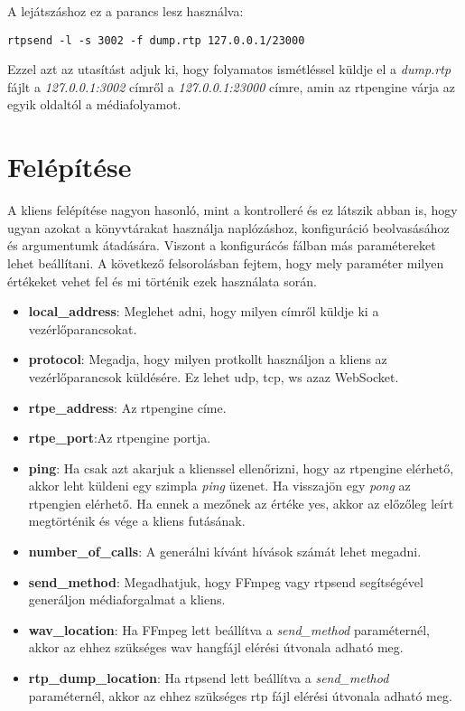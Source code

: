 A lejátszáshoz ez a parancs lesz használva: 

\begin{lstlisting}
rtpsend -l -s 3002 -f dump.rtp 127.0.0.1/23000
\end{lstlisting}

Ezzel azt az utasítást adjuk ki, hogy folyamatos ismétléssel küldje el a 
\textit{dump.rtp} fájlt a \textit{127.0.0.1:3002} címről a \textit{127.0.0.1:23000}
címre, amin az rtpengine várja az egyik oldaltól a médiafolyamot.

\section{Felépítése}

A kliens felépítése nagyon hasonló, mint a kontrolleré és ez látszik abban is, hogy
ugyan azokat a könyvtárakat használja naplózáshoz, konfiguráció beolvasásához és
argumentumk átadására. Viszont a konfigurácós fálban más paramétereket lehet 
beállítani. A következő felsorolásban fejtem, hogy mely paraméter milyen értékeket 
vehet fel és mi történik ezek használata során. 

\begin{itemize}
	\item \textbf{local\_address}: Meglehet adni, hogy milyen címről küldje
	ki a vezérlőparancsokat.
	\item \textbf{protocol}: Megadja, hogy milyen protkollt használjon a kliens az
	vezérlőparancsok küldésére. Ez lehet udp, tcp, ws azaz WebSocket.
	\item \textbf{rtpe\_address}: Az rtpengine címe. 
	\item \textbf{rtpe\_port}:Az rtpengine portja.
	\item \textbf{ping}: Ha csak azt akarjuk a klienssel ellenőrizni, hogy az rtpengine
	elérhető, akkor leht küldeni egy szimpla \textit{ping} üzenet. Ha visszajön egy
	\textit{pong} az rtpengien elérhető. Ha ennek a mezőnek az értéke yes, akkor 
	az előzőleg leírt megtörténik és vége a kliens futásának. 
	\item \textbf{number\_of\_calls}: A generálni kívánt hívások számát lehet megadni. 
	\item \textbf{send\_method}: Megadhatjuk, hogy FFmpeg vagy rtpsend segítségével
	generáljon médiaforgalmat a kliens.
	\item \textbf{wav\_location}: Ha FFmpeg lett beállítva a \textit{send\_method} 
	paraméternél, akkor az ehhez szükséges wav hangfájl elérési útvonala adható meg.
	\item \textbf{rtp\_dump\_location}: Ha rtpsend lett beállítva a 
	\textit{send\_method} paraméternél, akkor az ehhez szükséges rtp fájl elérési 
	útvonala adható meg.
\end{itemize}

